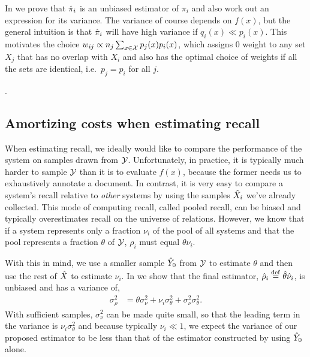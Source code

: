 In  we prove that ${\hat{\pi}}_i$ is an unbiased estimator of $\pi_i$ and also work out an expression for its variance. 
The variance of course depends on $f(x)$, but the general intuition is that 
${\hat{\pi}}_i$ will have high variance if $q_i(x) \ll p_i(x)$.
This motivates the choice $w_{ij} \propto n_{j} \sum_{x \in \mathcal{X}} p_j(x) p_i(x)$, which assigns $0$ weight to any set $X_j$ that has no overlap with $X_i$ and also has the optimal choice of weights if all the sets are identical, i.e.\ $p_j = p_i$ for all $j$.

.

\subsection{Amortizing costs when estimating recall}
When estimating recall, we ideally would like to compare the performance of the system on samples drawn from $\mathcal{Y}$.
Unfortunately, in practice, it is typically much harder to sample $\mathcal{Y}$ than it is to evaluate $f(x)$, because the former needs us to exhaustively annotate a document.
In contrast, it is very easy to compare a system's recall relative to \textit{other} systems by using the samples ${\hat{X}}_i$ we've already collected.
This mode of computing recall, called pooled recall, can be biased and typically overestimates recall on the universe of relations.
However, we know that if a system represents only a fraction $\nu_i$ of the pool of all systems and that the pool represents a fraction $\theta$ of $\mathcal{Y}$, $\rho_i$ must equal $\theta \nu_i$.


With this in mind, we use a smaller sample ${\hat{Y}}_0$ from $\mathcal{Y}$ to estimate $\theta$ and then use the rest of ${\hat{X}}$ to estimate $\nu_i$.
In  we show that the final estimator, ${\hat{\rho}}_i \stackrel{\rm def}{=} {\hat{\theta}} {\hat{\nu}}_i$, is unbiased and has a variance of,
\begin{align*}
  \sigma^2_\rho &= \theta \sigma^2_\nu + \nu_i \sigma^2_\theta + \sigma^2_\nu \sigma^2_\theta.
\end{align*}
With sufficient samples, $\sigma^2_\nu$ can be made quite small, so that the leading term in the variance is $\nu_i \sigma^2_\theta$ and because typically $\nu_i \ll 1$, we expect the variance of our proposed estimator to be less than that of the estimator constructed by using ${\hat{Y}}_0$ alone.

